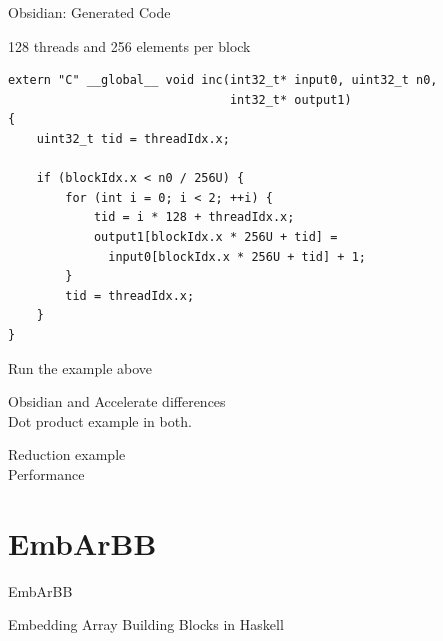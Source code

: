 \documentclass[xcolor=dvipsnames]{beamer}
\begin{document}
%
\begin{frame}[fragile]{Obsidian: Generated Code}
\begin{block}{128 threads and 256 elements per block}
\Fontvi
\begin{verbatim} 
extern "C" __global__ void inc(int32_t* input0, uint32_t n0,
                               int32_t* output1)
{
    uint32_t tid = threadIdx.x;
    
    if (blockIdx.x < n0 / 256U) {
        for (int i = 0; i < 2; ++i) {
            tid = i * 128 + threadIdx.x;
            output1[blockIdx.x * 256U + tid] = 
              input0[blockIdx.x * 256U + tid] + 1;
        }
        tid = threadIdx.x;
    }
}
\end{verbatim} 
\end{block} 


\end{frame} 

\begin{frame}{} 
  
  Run the example above
  
\end{frame} 
%
\begin{frame}{} 

  Obsidian and Accelerate differences \\
  Dot product example in both. 

\end{frame} 

\begin{frame}{}
  Reduction example \\
  Performance
\end{frame} 
    



%
\section{EmbArBB} 

\begin{frame}{EmbArBB} 
 \begin{center}
   {\Large Embedding Array Building Blocks in Haskell}
 \end{center}

\end{frame} 
\end{document}
